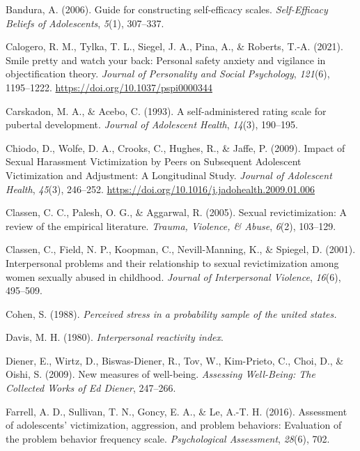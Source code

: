 \documentclass[
]{article}
\newlength{\cslhangindent}
\newenvironment{CSLReferences}[2] %
 {\begin{list}{}{%
  \setlength{\itemindent}{0pt}
  \setlength{\leftmargin}{0pt}
  \setlength{\parsep}{0pt}
  \ifodd #1
   \setlength{\leftmargin}{\cslhangindent}
   \setlength{\itemindent}{-1\cslhangindent}
  \fi
  \setlength{\itemsep}{#2\baselineskip}}}
 {\end{list}}
\begin{document}
\label{refs}
\begin{CSLReferences}{1}{0}
Bandura, A. (2006). Guide for constructing self-efficacy scales.
\emph{Self-Efficacy Beliefs of Adolescents}, \emph{5}(1), 307--337.

Calogero, R. M., Tylka, T. L., Siegel, J. A., Pina, A., \& Roberts,
T.-A. (2021). Smile pretty and watch your back: Personal safety anxiety
and vigilance in objectification theory. \emph{Journal of Personality
and Social Psychology}, \emph{121}(6), 1195--1222.
\url{https://doi.org/10.1037/pspi0000344}

Carskadon, M. A., \& Acebo, C. (1993). A self-administered rating scale
for pubertal development. \emph{Journal of Adolescent Health},
\emph{14}(3), 190--195.

Chiodo, D., Wolfe, D. A., Crooks, C., Hughes, R., \& Jaffe, P. (2009).
Impact of Sexual Harassment Victimization by Peers on Subsequent
Adolescent Victimization and Adjustment: A Longitudinal Study.
\emph{Journal of Adolescent Health}, \emph{45}(3), 246--252.
\url{https://doi.org/10.1016/j.jadohealth.2009.01.006}

Classen, C. C., Palesh, O. G., \& Aggarwal, R. (2005). Sexual
revictimization: A review of the empirical literature. \emph{Trauma,
Violence, \& Abuse}, \emph{6}(2), 103--129.

Classen, C., Field, N. P., Koopman, C., Nevill-Manning, K., \& Spiegel,
D. (2001). Interpersonal problems and their relationship to sexual
revictimization among women sexually abused in childhood. \emph{Journal
of Interpersonal Violence}, \emph{16}(6), 495--509.

Cohen, S. (1988). \emph{Perceived stress in a probability sample of the
united states.}

Davis, M. H. (1980). \emph{Interpersonal reactivity index}.

Diener, E., Wirtz, D., Biswas-Diener, R., Tov, W., Kim-Prieto, C., Choi,
D., \& Oishi, S. (2009). New measures of well-being. \emph{Assessing
Well-Being: The Collected Works of Ed Diener}, 247--266.

Farrell, A. D., Sullivan, T. N., Goncy, E. A., \& Le, A.-T. H. (2016).
Assessment of adolescents{'} victimization, aggression, and problem
behaviors: Evaluation of the problem behavior frequency scale.
\emph{Psychological Assessment}, \emph{28}(6), 702.


\end{CSLReferences}
\end{document}
